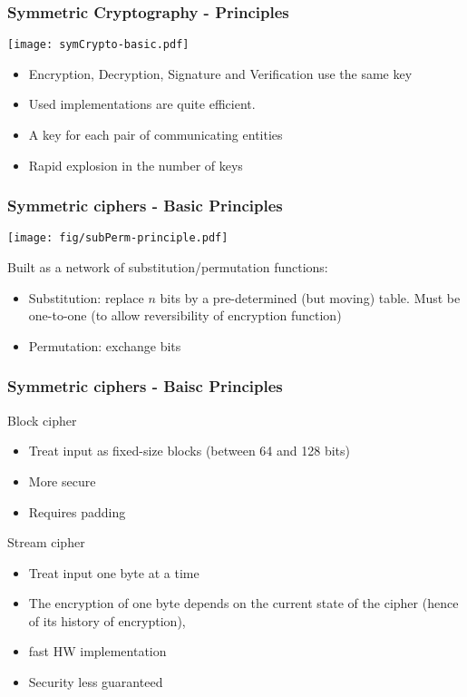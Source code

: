 \documentclass[
hyperref={pdfpagelabels=false}
,xcolor=table
]
{beamer}
\newcommand{\plus}{{\texttt{[image: plus.png]}}}
\newcommand{\minus}{{\texttt{[image: minus.png]}}}
\begin{document}
\begin{frame}
  \frametitle{Symmetric Cryptography - Principles}

  \begin{center}
    \texttt{[image: symCrypto-basic.pdf]}
  \end{center}

  \begin{itemize}
  \item Encryption, Decryption, Signature and Verification use the same key
  \item Used implementations are quite efficient. 
  \item A key for each pair of communicating entities
  \item[$\Rightarrow$] Rapid explosion in the number of keys
  \end{itemize}
\end{frame}


\begin{frame}
  \frametitle{Symmetric ciphers - Basic Principles}

  \begin{center}
    \texttt{[image: fig/subPerm-principle.pdf]}
  \end{center}
  
  Built as a network of substitution/permutation functions:
  \begin{itemize}
  \item Substitution: replace $n$ bits by a pre-determined (but moving) table. Must be one-to-one (to allow reversibility of encryption function)
  \item Permutation: exchange bits
  \end{itemize}
 
\end{frame}

\begin{frame}
  \frametitle{Symmetric ciphers - Baisc Principles}

  \begin{block}{Block cipher}
    \begin{itemize}
    \item Treat input as fixed-size blocks (between 64 and 128 bits)
    \item[\plus] More secure
    \item[\minus] Requires padding
    \end{itemize}
  \end{block}


  \begin{block}{Stream cipher}
    \begin{itemize}
    \item Treat input one byte at a time
    \item The encryption of one byte depends on the current state of the cipher (hence of its history of encryption), 
    \item[\plus] fast HW implementation
    \item[\minus] Security less guaranteed
    \end{itemize}
  \end{block}
\end{frame}
\end{document}
